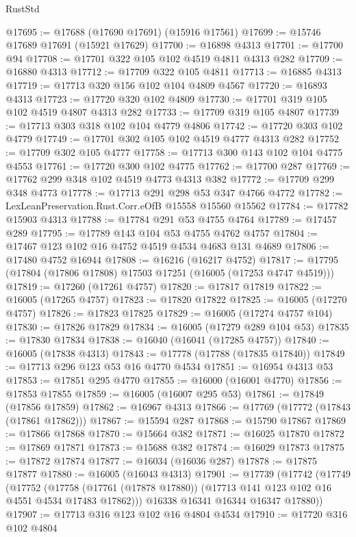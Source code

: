 \begin{lexlean}{RustStd}
\begin{coremodule}
@17695 := @17688 (@17690 @17691) (@15916 @17561)
@17699 := @15746 @17689 @17691 (@15921 @17629)
@17700 := @16898 @4313
@17701 := @17700 @94
@17708 := @17701 @322 @105 @102 @4519 @4811 @4313 @282
@17709 := @16880 @4313
@17712 := @17709 @322 @105 @4811
@17713 := @16885 @4313
@17719 := @17713 @320 @156 @102 @104 @4809 @4567
@17720 := @16893 @4313
@17723 := @17720 @320 @102 @4809
@17730 := @17701 @319 @105 @102 @4519 @4807 @4313 @282
@17733 := @17709 @319 @105 @4807
@17739 := @17713 @303 @318 @102 @104 @4779 @4806
@17742 := @17720 @303 @102 @4779
@17749 := @17701 @302 @105 @102 @4519 @4777 @4313 @282
@17752 := @17709 @302 @105 @4777
@17758 := @17713 @300 @143 @102 @104 @4775 @4553
@17761 := @17720 @300 @102 @4775
@17762 := @17700 @287
@17769 := @17762 @299 @348 @102 @4519 @4773 @4313 @382
@17772 := @17709 @299 @348 @4773
@17778 := @17713 @291 @298 @53 @347 @4766 @4772
@17782 := LexLeanPreservation.Rust.Corr.eOfB @15558 @15560 @15562
@17784 := @17782 @15903 @4313
@17788 := @17784 @291 @53 @4755 @4764
@17789 := @17457 @289
@17795 := @17789 @143 @104 @53 @4755 @4762 @4757
@17804 := @17467 @123 @102 @16 @4752 @4519 @4534 @4683 @131 @4689
@17806 := @17480 @4752 @16944
@17808 := @16216 (@16217 @4752)
@17817 := @17795 (@17804 (@17806 @17808) @17503 @17251 (@16005 (@17253 @4747 @4519)))
@17819 := @17260 (@17261 @4757)
@17820 := @17817 @17819
@17822 := @16005 (@17265 @4757)
@17823 := @17820 @17822
@17825 := @16005 (@17270 @4757)
@17826 := @17823 @17825
@17829 := @16005 (@17274 @4757 @104)
@17830 := @17826 @17829
@17834 := @16005 (@17279 @289 @104 @53)
@17835 := @17830 @17834
@17838 := @16040 (@16041 (@17285 @4757))
@17840 := @16005 (@17838 @4313)
@17843 := @17778 (@17788 (@17835 @17840))
@17849 := @17713 @296 @123 @53 @16 @4770 @4534
@17851 := @16954 @4313 @53
@17853 := @17851 @295 @4770
@17855 := @16000 (@16001 @4770)
@17856 := @17853 @17855
@17859 := @16005 (@16007 @295 @53)
@17861 := @17849 (@17856 @17859)
@17862 := @16967 @4313
@17866 := @17769 (@17772 (@17843 (@17861 @17862)))
@17867 := @15594 @287
@17868 := @15790 @17867
@17869 := @17866 @17868
@17870 := @15664 @382
@17871 := @16025 @17870
@17872 := @17869 @17871
@17873 := @15688 @382
@17874 := @16029 @17873
@17875 := @17872 @17874
@17877 := @16034 (@16036 @287)
@17878 := @17875 @17877
@17880 := @16005 (@16043 @4313)
@17901 := @17739
    (@17742
      (@17749
        (@17752
          (@17758 (@17761 (@17878 @17880)) (@17713 @141 @123 @102 @16 @4551 @4534 @17483 @17862)))
        @16338
        @16341
        @16344
        @16347
        @17880))
@17907 := @17713 @316 @123 @102 @16 @4804 @4534
@17910 := @17720 @316 @102 @4804

\end{coremodule}
\end{lexlean}
